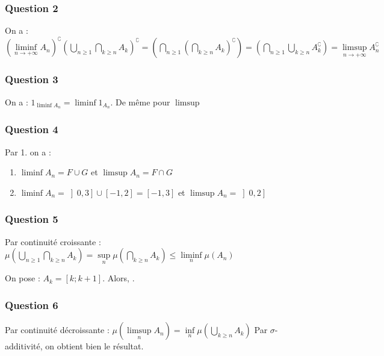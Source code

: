 \documentclass{cours}
\begin{document}
\subsubsection{Question 2}
On a : $\left(\liminf\limits_{n \to + \infty} A_{n}\right)^{\complement}\left(\bigcup\limits_{n \geq 1} \bigcap\limits_{k \geq n} A_{k}\right)^{\complement} = \left(\bigcap\limits_{n \geq 1} \left(\bigcap\limits_{k \geq n} A_{k}\right)^{\complement}\right) = \left(\bigcap\limits_{n \geq 1} \bigcup\limits_{k \geq n} A_{k}^{\complement}\right) = \limsup\limits_{n\to +\infty} A_{n}^{\complement} $

\subsubsection{Question 3}
On a : $1_{\liminf A_{n}} = \liminf 1_{A_{n}}$. De même pour $\limsup$

\subsubsection{Question 4}
Par 1. on a : 
\begin{enumerate}
    \item $\liminf A_{n} = F \cup G$ et $\limsup A_{n} = F \cap G$
    \item $\liminf A_{n} = \left]0, 3\right] \cup \left[-1, 2\right] = \left[-1, 3\right]$ et $\limsup A_{n} = \left]0, 2 \right]$
\end{enumerate}

\subsubsection{Question 5}
Par continuité croissante : $\mu\left(\bigcup\limits_{n \geq 1} \bigcap\limits_{k\geq n}A_{k} \right) = \sup\limits_{n} \mu\left(\bigcap\limits_{k \geq n} A_{k}\right) \leq \liminf\limits_{n} \mu\left(A_{n}\right)$

On pose : $A_{k} = \left[k; k+1\right]$. Alors, \qedsymbol.

\subsubsection{Question 6}
Par continuité décroissante : $\mu\left(\limsup\limits_{n}A_{n}\right) = \inf\limits_{n} \mu\left(\bigcup\limits_{k \geq n} A_{k}\right)$
Par $\sigma$-additivité, on obtient bien le résultat.
\end{document}
